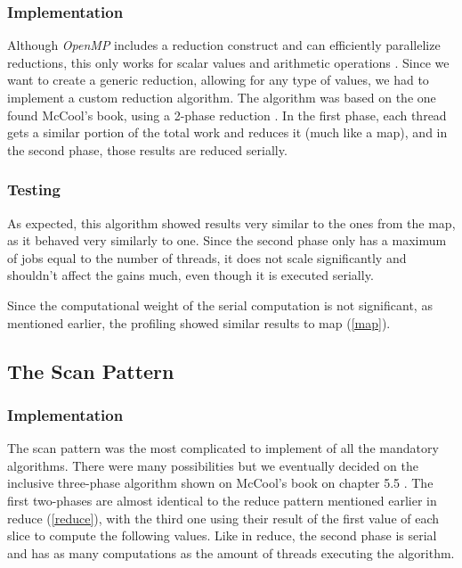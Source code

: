 \documentclass[9pt,journal]{IEEEtran}
\begin{document}
\subsubsection{Implementation}

Although \textit{OpenMP} includes a reduction construct and can efficiently parallelize reductions, this only works for scalar values and arithmetic operations \cite{ompreduct}. Since we want to create a generic reduction, allowing for any type of values, we had to implement a custom reduction algorithm. The algorithm was based on the one found McCool's book, using a 2-phase reduction \cite{mccool}. In the first phase, each thread gets a similar portion of the total work and reduces it (much like a map), and in the second phase, those results are reduced serially. 

\subsubsection{Testing}

As expected, this algorithm showed results very similar to the ones from the map, as it behaved very similarly to one. Since the second phase only has a maximum of jobs equal to the number of threads, it does not scale significantly and shouldn't affect the gains much, even though it is executed serially.

Since the computational weight of the serial computation is not significant, as mentioned earlier, the profiling showed similar results to map (\ref{map}).

\subsection{The Scan Pattern}
\label{scan}

\subsubsection{Implementation}

The scan pattern was the most complicated to implement of all the mandatory algorithms. There were many possibilities but we eventually decided on the inclusive three-phase algorithm shown on McCool's book on chapter 5.5 \cite{mccool}. The first two-phases are almost identical to the reduce pattern mentioned earlier in reduce (\ref{reduce}), with the third one using their result of the first value of each slice to compute the following values. Like in reduce, the second phase is serial and has as many computations as the amount of threads executing the algorithm. 
\end{document}
